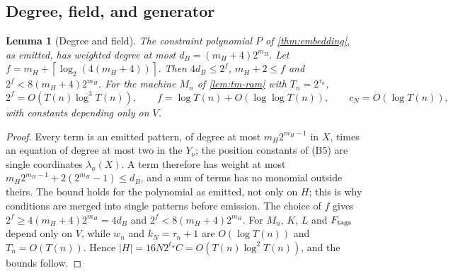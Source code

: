 \documentclass[11pt,letterpaper]{article}
\newtheorem{lemma}[theorem]{Lemma}
\theoremstyle{definition}
\theoremstyle{remark}
\newcommand{\ceil}[1]{\left\lceil #1\right\rceil}
\newcommand{\abs}[1]{\left|#1\right|}
\newcommand{\lgx}{\log_2}
\begin{document}
\subsection{Degree, field, and generator}

\begin{lemma}[Degree and field]\label{lem:acsp-degree}
The constraint polynomial \(P\) of \cref{thm:embedding}, as emitted, has
weighted degree at most \(d_B=(m_H+4)2^{m_H}\). Let
\(f=m_H+\ceil{\lgx(4(m_H+4))}\). Then \(4d_B\le2^f\), \(m_H+2\le f\)
and \(2^f<8(m_H+4)2^{m_H}\). For the machine \(M_n\) of
\cref{lem:tm-ram} with \(T_n=2^{\tau_n}\),
\[
 2^f=O(T(n)\log^3T(n)),\qquad f=\log T(n)+O(\log\log T(n)),\qquad
 c_N=O(\log T(n)),
\]
with constants depending only on \(V\).
\end{lemma}
\begin{proof}
Every term is an emitted pattern, of degree at most \(m_H2^{m_H-1}\) in
\(X\), times an equation of degree at most two in the \(Y_\nu\); the
position constants of (B5) are single coordinates \(\lambda_a(X)\). A
term therefore has weight at most
\(m_H2^{m_H-1}+2(2^{m_H}-1)\le d_B\), and a sum of terms has no monomial
outside theirs. The bound holds for the polynomial as emitted, not only
on \(H\); this is why conditions are merged into single patterns before
emission. The choice of \(f\) gives \(2^f\ge4(m_H+4)2^{m_H}=4d_B\) and
\(2^f<8(m_H+4)2^{m_H}\). For \(M_n\), \(K\), \(L\) and \(F_{\rm tags}\)
depend only on \(V\), while \(w_n\) and \(k_N=\tau_n+1\) are
\(O(\log T(n))\) and \(T_n=O(T(n))\). Hence
\(\abs H=16N2^{\ell_S} C=O(T(n)\log^2T(n))\), and the bounds follow.
\end{proof}
\end{document}
